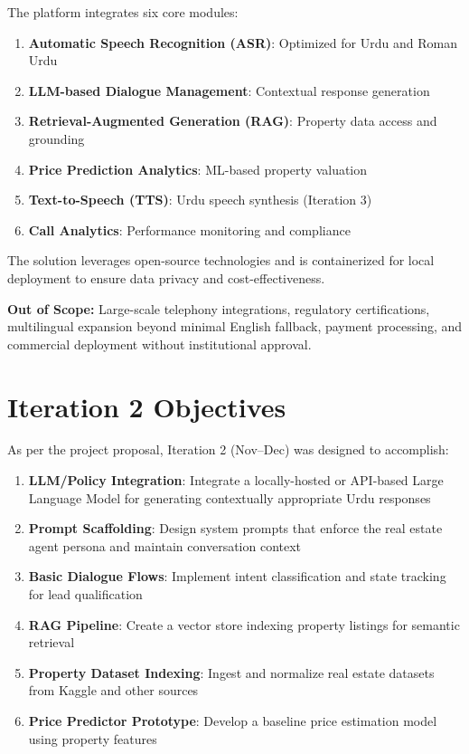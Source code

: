 The platform integrates six core modules:
\begin{enumerate}
    \item \textbf{Automatic Speech Recognition (ASR)}: Optimized for Urdu and Roman Urdu
    \item \textbf{LLM-based Dialogue Management}: Contextual response generation
    \item \textbf{Retrieval-Augmented Generation (RAG)}: Property data access and grounding
    \item \textbf{Price Prediction Analytics}: ML-based property valuation
    \item \textbf{Text-to-Speech (TTS)}: Urdu speech synthesis (Iteration 3)
    \item \textbf{Call Analytics}: Performance monitoring and compliance
\end{enumerate}

The solution leverages open-source technologies and is containerized for local deployment to ensure data privacy and cost-effectiveness.

\textbf{Out of Scope:} Large-scale telephony integrations, regulatory certifications, multilingual expansion beyond minimal English fallback, payment processing, and commercial deployment without institutional approval.

\section{Iteration 2 Objectives}

As per the project proposal, Iteration 2 (Nov--Dec) was designed to accomplish:

\begin{enumerate}
    \item \textbf{LLM/Policy Integration}: Integrate a locally-hosted or API-based Large Language Model for generating contextually appropriate Urdu responses
    \item \textbf{Prompt Scaffolding}: Design system prompts that enforce the real estate agent persona and maintain conversation context
    \item \textbf{Basic Dialogue Flows}: Implement intent classification and state tracking for lead qualification
    \item \textbf{RAG Pipeline}: Create a vector store indexing property listings for semantic retrieval
    \item \textbf{Property Dataset Indexing}: Ingest and normalize real estate datasets from Kaggle and other sources
    \item \textbf{Price Predictor Prototype}: Develop a baseline price estimation model using property features
\end{enumerate}

